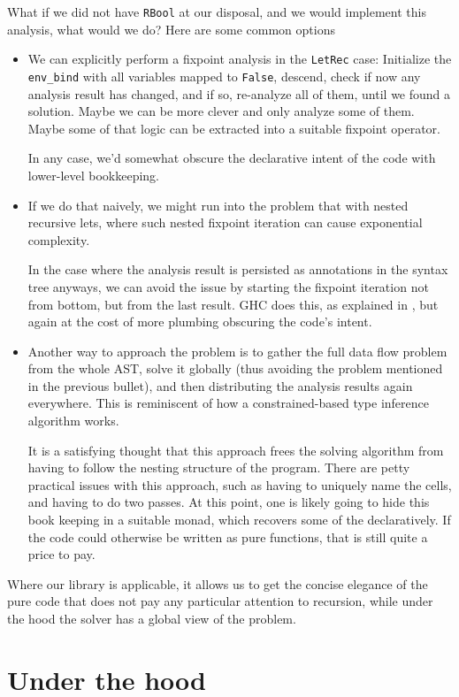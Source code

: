 \documentclass[manuscript,screen,acmsmall]{acmart}
\begin{document}
What if we did not have \verb|RBool| at our disposal, and we would implement this analysis, what would we do? Here are some common options
\begin{itemize}
\item We can explicitly perform a fixpoint analysis in the \verb|LetRec| case: Initialize the \verb|env_bind| with all variables mapped to \verb|False|, descend, check if now any analysis result has changed, and if so, re-analyze all of them, until we found a solution.
Maybe we can be more clever and only analyze some of them.
Maybe some of that logic can be extracted into a suitable fixpoint operator.

In any case, we'd somewhat obscure the declarative intent of the code with lower-level bookkeeping.
\item If we do that naively, we might run into the problem that with nested recursive lets, where such nested fixpoint iteration can cause exponential complexity.

In the case where the analysis result is persisted as annotations in the syntax tree anyways, we can avoid the issue by starting the fixpoint iteration not from bottom, but from the last result. GHC does this, as explained in
\citet[Section 6.6]{modular}, but again at the cost of more plumbing obscuring the code's intent.

\item Another way to approach the problem is to gather the full data flow problem from the whole AST, solve it globally (thus avoiding the problem mentioned in the previous bullet), and then distributing the analysis results again everywhere. This is reminiscent of how a constrained-based type inference algorithm works.

It is a satisfying thought that this approach frees the solving algorithm from having to follow the nesting structure of the program. There are petty practical issues with this approach, such as having to uniquely name the cells, and having to do two passes. At this point, one is likely going to hide this book keeping in a suitable monad, which recovers some of the declaratively. If the code could otherwise be written as pure functions, that is still quite a price to pay.
\end{itemize}
Where our library is applicable, it allows us to get the concise elegance of the pure code that does not pay any particular attention to recursion, while under the hood the solver has a global view of the problem.


\section{Under the hood}\label{sec:impl}
\end{document}
